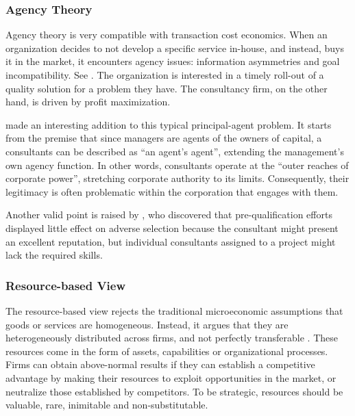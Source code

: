 \documentclass[12pt]{article}
\begin{document}
\hypertarget{agency-theory}{%
\subsubsection{Agency Theory}\label{agency-theory}}

Agency theory is very compatible with transaction cost economics. When
an organization decides to not develop a specific service in-house, and
instead, buys it in the market, it encounters agency issues: information
asymmetries and goal incompatibility. See \citet{shapiro2005}. The
organization is interested in a timely roll-out of a quality solution
for a problem they have. The consultancy firm, on the other hand, is
driven by profit maximization.

\citet{fincham2002} made an interesting addition to this typical
principal-agent problem. It starts from the premise that since managers
are agents of the owners of capital, a consultants can be described as
``an agent's agent'', extending the management's own agency function. In
other words, consultants operate at the ``outer reaches of corporate
power'', stretching corporate authority to its limits. Consequently,
their legitimacy is often problematic within the corporation that
engages with them.

Another valid point is raised by \citet[23]{basu2011} , who discovered
that pre-qualification efforts displayed little effect on adverse
selection because the consultant might present an excellent reputation,
but individual consultants assigned to a project might lack the required
skills.

\hypertarget{resource-based-view}{%
\subsubsection{Resource-based View}\label{resource-based-view}}

The resource-based view rejects the traditional microeconomic
assumptions that goods or services are homogeneous. Instead, it argues
that they are heterogeneously distributed across firms, and not
perfectly transferable \citet[392]{watjatrakul2005}. These resources
come in the form of assets, capabilities or organizational processes.
Firms can obtain above-normal results if they can establish a
competitive advantage by making their resources to exploit opportunities
in the market, or neutralize those established by competitors. To be
strategic, resources should be valuable, rare, inimitable and
non-substitutable.
\end{document}
